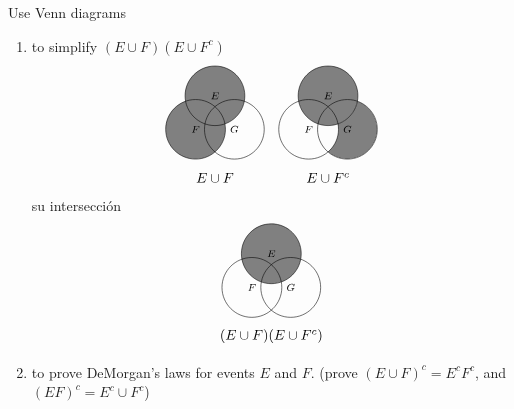 \item Use Venn diagrams
\begin{enumerate}
    \item to simplify $(E \cup F)(E \cup F^c)$
    \[
    \begin{tikzpicture}[scale=0.75]
    \fill[fill=black!50] ( 90:.75) circle (1) (210:.75) circle (1);
    \foreach \a/\l in {90/E,210/F,330/G} {
        \path[draw] ++(\a:.75) circle (1) node {$\scriptstyle \l$};
    }
    \node at (0, -2) {$E \cup F$};
    \end{tikzpicture}
    \hspace{1em}
    \begin{tikzpicture}[scale=0.75]
    \fill[fill=black!50] (90:.75) circle (1);
    \scope[even odd rule]
        \clip ( 90:.75) circle (1) (330:.75) circle (1);
        \clip (210:.75) circle (1) (330:.75) circle (1);
        \fill[fill=black!50] (330:.75) circle (1);
    \endscope
    \foreach \a/\l in {90/E,210/F,330/G} {
        \path[draw] ++(\a:.75) circle (1) node {$\scriptstyle \l$};
    }
    \node at (0, -2) {$E \cup F^c$};
    \end{tikzpicture}
    \]
    su intersección
    \[
    \begin{tikzpicture}[scale=0.75]
    \fill[fill=black!50] (90:.75) circle (1);
    \foreach \a/\l in {90/E,210/F,330/G} {
        \path[draw] ++(\a:.75) circle (1) node {$\scriptstyle \l$};
    }
    \node at (0, -2) {$(E \cup F) (E \cup F^c)$};
    \end{tikzpicture}
    \]
    \item to prove DeMorgan’s laws for events $E$ and $F$. (prove $(E \cup F)^c = E^cF^c$, and $(EF)^c = E^c \cup F^c$)


\end{enumerate}
